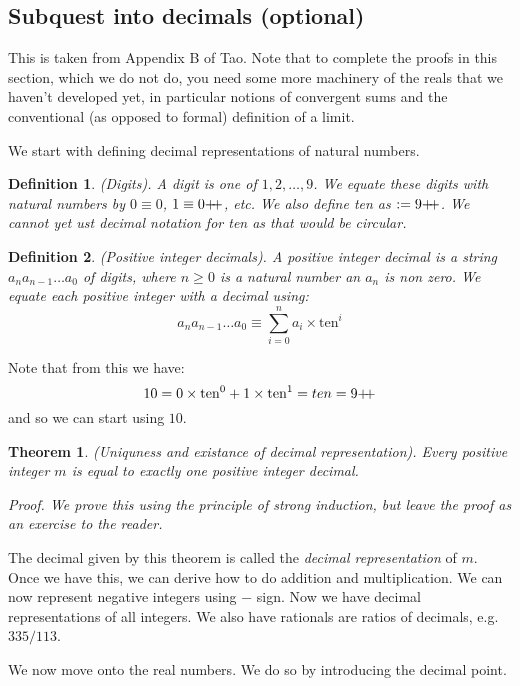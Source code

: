\documentclass{article}
\newtheorem{definition}{Definition}[subsection]
\newtheorem{theorem}{Theorem}[subsection]
\newcommand{\pp}{\mathbin{+\mkern-5mu+}}
\let\it\textit
\begin{document}
\subsection{Subquest into decimals (optional)} 
\label{decimals}

This is taken from Appendix B of Tao.
Note that to complete the proofs in this 
section, which we do not do, you need 
some more machinery of the reals that 
we haven't developed yet, in particular 
notions of convergent sums and 
the conventional (as opposed to formal) 
definition of a limit.

We start with defining decimal representations 
of natural numbers.

\begin{definition}
	(Digits). A digit is one of $1,2,\dots,9$.
	We equate these digits with natural numbers 
	by $0 \equiv 0$, $1 \equiv 0\pp$, etc. 
	We also define ten as $:= 9\pp$. 
	We cannot yet ust decimal notation for 
	ten as that would be circular.
\end{definition}

\begin{definition}
	(Positive integer decimals). A positive 
	integer decimal is a string 
	$a_na_{n-1}\dots a_0$ of digits, 
	where $n \geq 0$ is a natural 
	number an $a_n$ is non zero. 
	We equate each positive 
	integer with a decimal using: 
	$$
	a_n a_{n-1} \dots a_0 \equiv \sum_{i=0}^n a_i \times \mathrm{ten}^i
	$$
\end{definition}

Note that from this we have:
$$
10 = 0 \times \mathrm{ten}^0  + 1 \times \mathrm{ten}^1 = ten = 9\pp
$$
and so we can start using $10$.

\begin{theorem}
	(Uniquness and existance of decimal representation). 
	Every positive integer $m$ is equal to 
	exactly one positive integer decimal. 

	\it{Proof}. We prove this using the principle 
	of strong induction, but leave the proof 
	as an exercise to the reader.
\end{theorem}

The decimal given by this theorem is called 
the \it{decimal representation} of $m$. Once 
we have this, we can derive how to 
do addition and multiplication. We can 
now represent negative integers 
using $-$ sign. Now we have 
decimal representations of all integers.
We also have rationals are ratios 
of decimals, e.g. $335/113$.

We now move onto the real numbers. We do 
so by introducing the decimal point.
\end{document}
